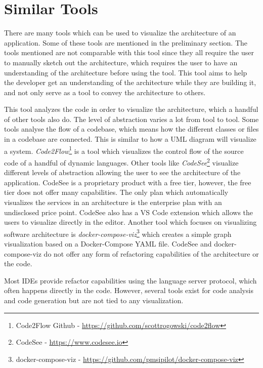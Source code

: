 \section{Similar Tools}
There are many tools which can be used to visualize the architecture of an application. Some of these tools are mentioned in the preliminary section.
The tools mentioned are not comparable with this tool since they all require the user to manually sketch out the architecture, which requires the user to have an understanding of the architecture before using the tool.
This tool aims to help the developer get an understanding of the architecture while they are building it, and not only serve as a tool to convey the architecture to others.

This tool analyzes the code in order to visualize the architecture, which a handful of other tools also do. 
The level of abstraction varies a lot from tool to tool. Some tools analyse the flow of a codebase, which means how the different classes or files in 
a codebase are connected. This is similar to how a UML diagram will visualize a system. \textit{Code2Flow}\footnote{Code2Flow Github - \url{https://github.com/scottrogowski/code2flow}} is a tool which visualizes the control flow of the source code of a handful of dynamic languages. Other tools like \textit{CodeSee}\footnote{CodeSee - \url{https://www.codesee.io}} visualize different levels of abstraction allowing the user to see the architecture of the application.
CodeSee is a proprietary product with a free tier, however, the free tier does not offer many capabilities.
The only plan which automatically visualizes the services in an architecture is the enterprise plan with an undisclosed price point. 
CodeSee also has a VS Code extension which allows the users to visualize directly in the editor. Another tool which focuses on visualizing software architecture 
is \textit{docker-compose-viz}\footnote{docker-compose-viz - \url{https://github.com/pmsipilot/docker-compose-viz}} which creates a simple graph visualization based on a Docker-Compose YAML file.
CodeSee and docker-compose-viz do not offer any form of refactoring capabilities of the architecture or the code.

Most IDEs provide refactor capabilities using the language server protocol, which often happens directly in the code.
However, several tools exist for code analysis and code generation but are not tied to any visualization.

